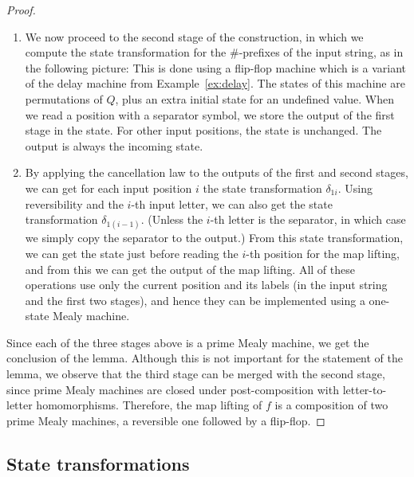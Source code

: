 \begin{proof}
\begin{enumerate}
        Here is  a picture of the first stage. In the picture, we use hexadecimal for indexing positions (so that we can have more  single digit indexes) and we write  $\delta_{ij}$ for the state transformation which corresponds to the infix of the input string that begins in the $i$-th position and ends in the $j$-th position, including both endpoints:
        \item We now proceed to the second stage of the construction, in which we compute the state transformation for the $\#$-prefixes of the input string, as in the following picture:
        This is done using a flip-flop machine which is a  variant of the delay machine from Example~\ref{ex:delay}. The states of this machine are permutations of $Q$, plus an extra initial state for an undefined value. When we read a position with a separator symbol, we store the output of the first stage in the state. For other input positions, the state is unchanged. The output is always the incoming state. 
        \item By applying the cancellation law to the outputs of the first and second stages, we can get for each input position $i$ the state transformation $\delta_{1i}$. Using reversibility and the $i$-th input letter, we can also get the state transformation $\delta_{1(i-1)}$. (Unless the $i$-th letter is the separator, in which case we simply copy the separator to the output.) From this state transformation, we can get the state just before reading the $i$-th position for the map lifting, and from this we can get the output of the map lifting. All of these operations use only the current position and its labels (in the input string and the first two stages), and hence they can be implemented using a one-state Mealy machine.
    \end{enumerate}
    Since each of the three stages above is a prime Mealy machine, we get the conclusion of the lemma. Although this is not important for the statement of the lemma, we observe that the third stage can be merged with the second stage, since prime Mealy machines are closed under post-composition with letter-to-letter homomorphisms. Therefore, the map lifting of $f$ is a composition of two prime Mealy machines, a reversible one followed by a flip-flop.
\end{proof}

\subsection{State transformations}
\label{sec:state-transformations}

